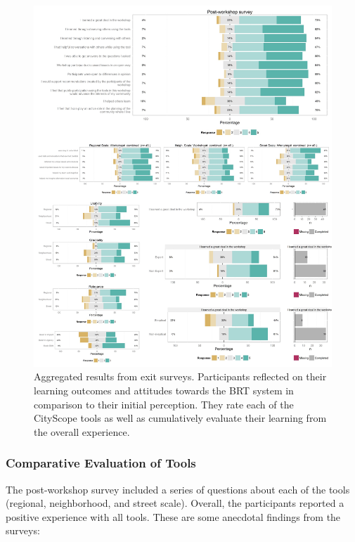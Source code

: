 {{        \begin{figure}[!htb]
            \begin{center}
                \includegraphics[width=1\textwidth]{chapters/consensus/BRT/figures/brt1.jpeg}
            \end{center}
            \caption{Aggregated results from exit surveys. Participants reflected on their learning outcomes and attitudes towards the BRT system in comparison to their initial perception. They rate each of the CityScope tools as well as cumulatively evaluate their learning from the overall experience.}
            \label{fig:brt_exit_survey}
        \end{figure}


        \subsubsection{Comparative Evaluation of Tools}
        {
            The post-workshop survey included a series of questions about each of the tools (regional, neighborhood, and street scale). Overall, the participants reported a positive experience with all tools. These are some anecdotal findings from the surveys:

}}}
